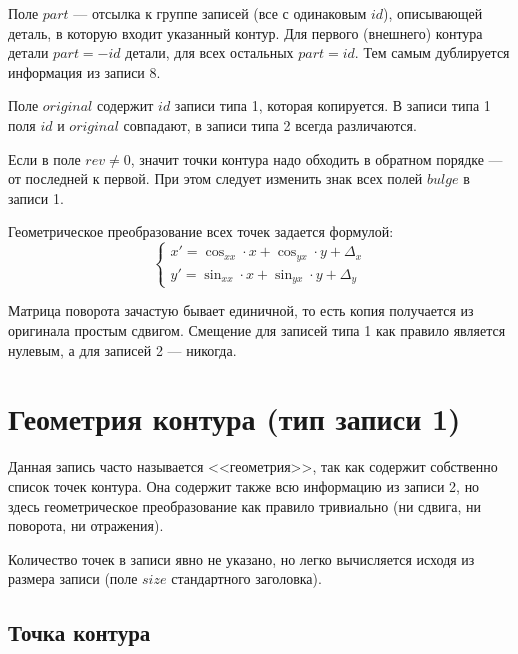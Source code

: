 Поле
$part$
---
отсылка к группе записей
(все с одинаковым $id$),
описывающей деталь,
в которую входит указанный контур.
Для первого
(внешнего)
контура детали
$part = -id$
детали,
для всех остальных
$part = id$.
Тем самым дублируется информация из записи 8.

Поле
$original$
содержит $id$ записи типа 1,
которая копируется.
В записи типа 1 поля $id$ и $original$ совпадают,
в записи типа 2 всегда различаются.

Если в поле
$rev \ne 0$,
значит точки контура надо обходить в обратном порядке --- от последней к первой.
При этом следует изменить знак всех полей $bulge$ в записи 1.

Геометрическое преобразование всех точек задается формулой:
\begin{equation}
  \begin{cases}
    x' = \cos_{xx} \cdot x + \cos_{yx} \cdot y + \Delta_x
    \\
    y' = \sin_{xx} \cdot x + \sin_{yx} \cdot y + \Delta_y
  \end{cases}
\end{equation}

Матрица поворота зачастую бывает единичной,
то есть копия получается из оригинала простым сдвигом.
Смещение для записей типа 1 как правило является нулевым,
а для записей 2 --- никогда.

\section*{Геометрия контура (тип записи 1)}
Данная запись часто называется <<геометрия>>,
так как содержит собственно список точек контура.
Она содержит также всю информацию из записи 2,
но здесь геометрическое преобразование как правило
тривиально
(ни сдвига, ни поворота, ни отражения).


Количество точек в записи явно не указано,
но легко вычисляется исходя из размера записи
(поле $size$ стандартного заголовка).

\subsection*{Точка контура}

